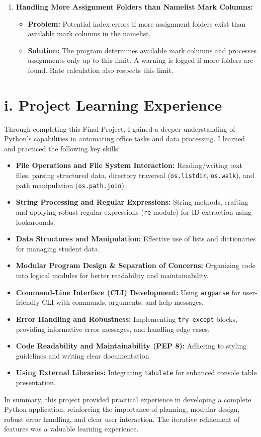 \documentclass[11pt, a4paper]{article}
\begin{document}
\begin{enumerate}[leftmargin=*]
    \item \textbf{Handling More Assignment Folders than Namelist Mark Columns:}
    \begin{itemize}
        \item \textbf{Problem:} Potential index errors if more assignment folders exist than available mark columns in the namelist.
        \item \textbf{Solution:} The program determines available mark columns and processes assignments only up to this limit. A warning is logged if more folders are found. Rate calculation also respects this limit.
    \end{itemize}
\end{enumerate}

\section*{i. Project Learning Experience}
Through completing this Final Project, I gained a deeper understanding of Python's capabilities in automating office tasks and data processing. I learned and practiced the following key skills:
\begin{itemize}[leftmargin=*]
    \item \textbf{File Operations and File System Interaction:} Reading/writing text files, parsing structured data, directory traversal (\texttt{os.listdir}, \texttt{os.walk}), and path manipulation (\texttt{os.path.join}).
    \item \textbf{String Processing and Regular Expressions:} String methods, crafting and applying robust regular expressions (\texttt{re} module) for ID extraction using lookarounds.
    \item \textbf{Data Structures and Manipulation:} Effective use of lists and dictionaries for managing student data.
    \item \textbf{Modular Program Design \& Separation of Concerns:} Organizing code into logical modules for better readability and maintainability.
    \item \textbf{Command-Line Interface (CLI) Development:} Using \texttt{argparse} for user-friendly CLI with commands, arguments, and help messages.
    \item \textbf{Error Handling and Robustness:} Implementing \texttt{try-except} blocks, providing informative error messages, and handling edge cases.
    \item \textbf{Code Readability and Maintainability (PEP 8):} Adhering to styling guidelines and writing clear documentation.
    \item \textbf{Using External Libraries:} Integrating \texttt{tabulate} for enhanced console table presentation.
\end{itemize}
In summary, this project provided practical experience in developing a complete Python application, reinforcing the importance of planning, modular design, robust error handling, and clear user interaction. The iterative refinement of features was a valuable learning experience.
\end{document}

